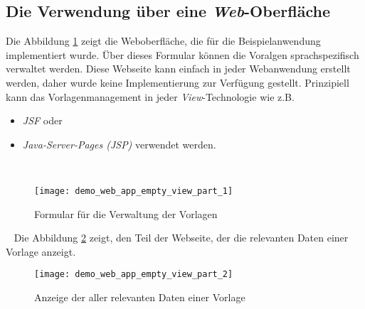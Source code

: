 \subsection{Die Verwendung über eine \emph{Web}-Oberfläche}
Die Abbildung \ref{fig:demo_web_app_empty_view_part_1} zeigt die Weboberfläche, die für die Beispielanwendung implementiert wurde. Über dieses Formular können die Voralgen sprachspezifisch verwaltet werden. Diese Webseite kann einfach in jeder Webanwendung erstellt werden, daher wurde keine Implementierung zur Verfügung gestellt. Prinzipiell kann das Vorlagenmanagement in jeder \emph{View}-Technologie wie z.B.
\begin{itemize}
	\item\emph{JSF} oder
	\item\emph{Java-Server-Pages (JSP)} verwendet werden.
\end{itemize}
\newpage
\ \begin{figure}[h]
\centering
\texttt{[image: demo\_web\_app\_empty\_view\_part\_1]}
\caption{Formular für die Verwaltung der Vorlagen}
\label{fig:demo_web_app_empty_view_part_1}
\end{figure}
\ \newline
Die Abbildung \ref{fig:demo_web_app_empty_view_part_2} zeigt, den Teil der Webseite, der die relevanten Daten einer Vorlage anzeigt.

\begin{figure}[h]
\centering
\texttt{[image: demo\_web\_app\_empty\_view\_part\_2]}
\caption{Anzeige der aller relevanten Daten einer Vorlage}
\label{fig:demo_web_app_empty_view_part_2}
\end{figure}
\ \newpage


